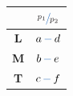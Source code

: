 \begin{minipage}{0.13\textwidth}
    \centering
    \begin{tabular}{c|c}
                   & ${\color{NavyBlue}\sfrac{\color{Black}p_1}{\color{Black}p_2}}$ \\ \hline
        \textbf{L} & $a\,{\color{NavyBlue}-}\,d$                                   \\
        \textbf{M} & $b\,{\color{NavyBlue}-}\,e$                                   \\
        \textbf{T} & $c\,{\color{NavyBlue}-}\,f$
    \end{tabular}
\end{minipage}
